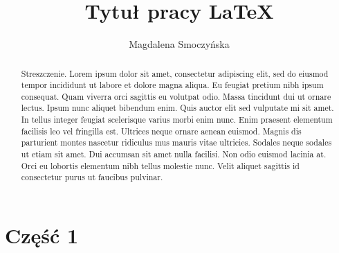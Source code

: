 \documentclass[12pt,a4paper]{article}
\title{Tytuł pracy \LaTeX}
\author{Magdalena Smoczyńska}
\begin{document}
	\maketitle
	
	\begin{abstract}
		Streszczenie. Lorem ipsum dolor sit amet, consectetur adipiscing elit, sed do eiusmod tempor incididunt ut labore et dolore magna aliqua. Eu feugiat pretium nibh ipsum consequat. Quam viverra orci sagittis eu volutpat odio. Massa tincidunt dui ut ornare lectus. Ipsum nunc aliquet bibendum enim. Quis auctor elit sed vulputate mi sit amet. In tellus integer feugiat scelerisque varius morbi enim nunc. Enim praesent elementum facilisis leo vel fringilla est. Ultrices neque ornare aenean euismod. Magnis dis parturient montes nascetur ridiculus mus mauris vitae ultricies. Sodales neque sodales ut etiam sit amet. Dui accumsan sit amet nulla facilisi. Non odio euismod lacinia at. Orci eu lobortis elementum nibh tellus molestie nunc. Velit aliquet sagittis id consectetur purus ut faucibus pulvinar.
	\end{abstract}
	
	\newpage
	
	\tableofcontents
	
	\newpage
	
	\part {Część 1}
\end{document}
